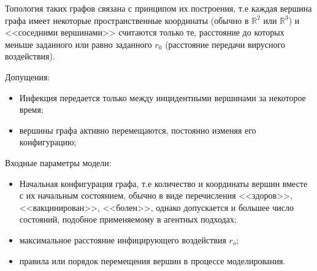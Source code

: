 Топология таких графов связана с принципом их построения, т.е каждая вершина графа имеет некоторые пространственные координаты (обычно в $\mathbb{R}^2$ или $\mathbb{R}^3$) и <<соседними вершинами>> считаются только те, расстояние до которых  меньше заданного или равно заданного $r_0$ (расстояние передачи вирусного воздействия). 

Допущения:
\begin{itemize}
	\item Инфекция передается только между инцидентными вершинами за некоторое время;
	\item вершины графа активно перемещаются, постоянно изменяя его конфигурацию;
\end{itemize}
Входные параметры модели:
\begin{itemize}
	\item Начальная конфигурация графа, т.е количество и координаты вершин вместе с их начальным состоянием, обычно в виде перечисления 	<<здоров>>, <<вакцинирован>>, <<болен>>, однако допускается и большее число состояний, подобное применяемому в агентных подходах;
	\item максимальное расстояние инфицирующего воздействия $r_o$;
	\item правила или порядок перемещения вершин в процессе моделирования.
\end{itemize}